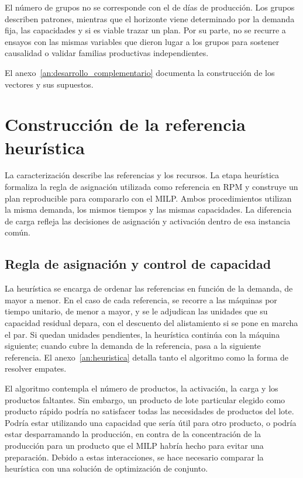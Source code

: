 \documentclass[12pt,a4paper,oneside]{article}
\begin{document}
El número de grupos no se corresponde con el de días de producción. Los grupos describen patrones, mientras que el horizonte viene determinado por la demanda fija, las capacidades y si es viable trazar un plan. Por su parte, no se recurre a ensayos con las mismas variables que dieron lugar a los grupos para sostener causalidad o validar familias productivas independientes.

El anexo~\ref{an:desarrollo_complementario} documenta la construcción de los vectores y sus supuestos.

\section{Construcción de la referencia heurística}\label{sec:heuristica}
La caracterización describe las referencias y los recursos. La etapa heurística formaliza la regla de asignación utilizada como referencia en RPM y construye un plan reproducible para compararlo con el MILP. Ambos procedimientos utilizan la misma demanda, los mismos tiempos y las mismas capacidades. La diferencia de carga refleja las decisiones de asignación y activación dentro de esa instancia común.

\subsection{Regla de asignación y control de capacidad}
La heurística se encarga de ordenar las referencias en función de la demanda, de mayor a menor. En el caso de cada referencia, se recorre a las máquinas por tiempo unitario, de menor a mayor, y se le adjudican las unidades que su capacidad residual depara, con el descuento del alistamiento si se pone en marcha el par. Si quedan unidades pendientes, la heurística continúa con la máquina siguiente; cuando cubre la demanda de la referencia, pasa a la siguiente referencia. El anexo~\ref{an:heuristica} detalla tanto el algoritmo como la forma de resolver empates.

El algoritmo contempla el número de productos, la activación, la carga y los productos faltantes. Sin embargo, un producto de lote particular elegido como producto rápido podría no satisfacer todas las necesidades de productos del lote. Podría estar utilizando una capacidad que sería útil para otro producto, o podría estar desparramando la producción, en contra de la concentración de la producción para un producto que el MILP habría hecho para evitar una preparación. Debido a estas interacciones, se hace necesario comparar la heurística con una solución de optimización de conjunto.
\end{document}
